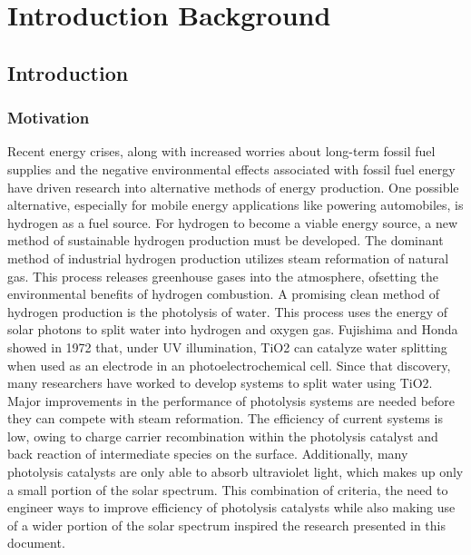 \documentclass[12pt,%
              twoside,
               letterpaper]{uiothesis}
\begin{document}
    

  \mainmatter
	  
	\part{Introduction \oldand Background} %

\chapter{Introduction}
\label{ch:introduction}


\section{Motivation}
\label{sec:intro.motivation}


Recent energy crises, along with increased worries about long-term fossil fuel supplies
and the negative environmental effects associated with fossil fuel energy have driven
research into alternative methods of energy production. One possible alternative,
especially for mobile energy applications like powering automobiles, is hydrogen as a fuel
source. For hydrogen to become a viable energy source, a new method of sustainable
hydrogen production must be developed. The dominant method of industrial hydrogen
production utilizes steam reformation of natural gas.\cite{Report:2004wb} This process
releases greenhouse gases into the atmosphere, ofsetting the environmental benefits of
hydrogen combustion.
A promising clean method of hydrogen production is the photolysis of water. This process
uses the energy of solar photons to split water into hydrogen and oxygen gas. Fujishima
and Honda\cite{Fujishima:1972hc} showed in 1972 that, under UV illumination, TiO2 can
catalyze water splitting when used as an electrode in an photoelectrochemical cell. Since
that discovery, many researchers have worked to develop systems to split water using
TiO2.\cite{User:2001tg,Frank:1987hd,Karakitsou:1993fq,Linsebigler:1995gi,Schrauzer:1977ex} Major improvements in the performance of photolysis systems are needed before they
can compete with steam reformation. The efficiency of current systems is low, owing to
charge carrier recombination within the photolysis catalyst and back reaction of
intermediate species on the surface. Additionally, many photolysis catalysts are only able
to absorb ultraviolet light, which makes up only a small portion of the solar spectrum.
This combination of criteria, the need to engineer ways to improve efficiency of
photolysis catalysts while also making use of a wider portion of the solar spectrum
inspired the research presented in this document.
\end{document}
